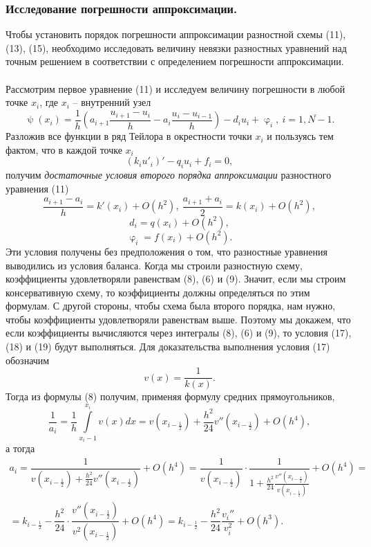 \documentclass[a4paper, 12pt]{report}
\numberwithin{equation}{section}
\renewcommand{\varphi}{\upvarphi}
\renewcommand{\psi}{\uppsi}
\begin{document}
	\subsubsection{Исследование погрешности аппроксимации.}
	Чтобы установить порядок погрешности аппроксимации разностной схемы (11), (13), (15), необходимо исследовать величину невязки разностных уравнений над точным решением в соответствии с определением погрешности аппроксимации.\\\\
	Рассмотрим первое уравнение (11) и исследуем величину погрешности в любой точке $x_i$, где $x_i$ -- внутренний узел
	$$\psi(x_i) = 	\dfrac{1}{h}\left(a_{i+1}\dfrac{u_{i+1} - u_i}{h} - a_i \dfrac{u_i - u_{i-1}}{h}\right)-d_iu_i + \varphi_i,\ i = \overline {1, N-1}.$$
	Разложив все функции в ряд Тейлора в окрестности точки $x_i$ и пользуясь тем фактом, что в каждой точке $x_i$
	$$(k_i u'_i)' - q_i u_i + f_i = 0,$$
	получим \textit{достаточные условия второго порядка аппроксимации} разностного уравнения (11)
	\begin{equation}
		\dfrac{a_{i+1} - a_i}{h} = k'(x_i) + O(h^2),\ \dfrac{a_{i+1} + a_i}{2} = k(x_i) + O(h^2),
	\end{equation}
	\begin{equation}
		d_i = q(x_i) + O(h^2),
	\end{equation}
	\begin{equation}
		\varphi_i = f(x_i) + O(h^2).
	\end{equation}
	Эти условия получены без предположения о том, что разностные уравнения выводились из условия баланса. Когда мы строили разностную схему, коэффициенты удовлетворяли равенствам (8), (6) и (9). Значит, если мы строим консервативную схему, то коэффициенты должны определяться по этим формулам. С другой стороны, чтобы схема была второго порядка, нам нужно, чтобы коэффициенты удовлетворяли равенствам выше. Поэтому мы докажем, что если коэффициенты вычисляются через интегралы (8), (6) и (9), то условия (17), (18) и (19) будут выполняться. Для доказательства выполнения условия (17) обозначим $$v(x) = \dfrac 1{k(x)}.$$
	Тогда из формулы (8) получим, применяя формулу средних прямоугольников,
	$$\dfrac 1 {a_i} = \dfrac 1h \int\limits_{x_i-1}^{x_i}v(x)dx = v(x_{i-\frac 12}) + \dfrac {h^2}{24}v''(x_{i-\frac 12}) + O(h^4),$$
	а тогда
	\begin{multline*}
		a_i = \dfrac{1}{v(x_{i-\frac 12}) + \frac {h^2}{24}v''(x_{i-\frac 12})} + O(h^4) = \dfrac{1}{v(x_{i-\frac 12})}\cdot \dfrac{1}{1+ \frac {h^2}{24}\frac{v''(x_{i-\frac 12})}{v(x_{i-\frac12})}} + O(h^4) =\\ = k_{i-\frac 12}-\dfrac {h^2}{24}
	\cdot \dfrac {v''(x_{i-\frac12})}{v^2(x_{i-\frac12})} + O(h^4) = k_{i - \frac 12} - \dfrac{h^2}{24} \dfrac{v_i''}{v_i^2} + O(h^3).
	\end{multline*}
\end{document}
